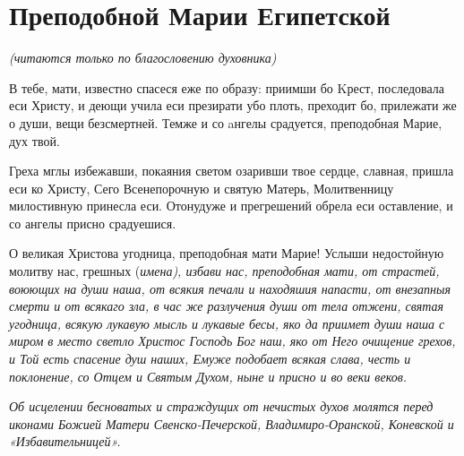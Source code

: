 

\label{_content_prinapadenii-nechistoy-sili}

 


 

\section{Преподобной Марии Египетской}
 


\itshape (читаются только по благословению духовника)\normalfont{}




В тебе, мати, известно спасеся еже по образу: приимши бо Kрест, последовала еси Христу, и деющи учила еси презирати убо плоть, преходит бо, прилежати же о души, вещи безсмертней. Темже и со aнгелы срадуется, преподобная Марие, дух твой.




Греха мглы избежавши, покаяния светом озаривши твое сердце, славная, пришла еси ко Христу, Сего Всенепорочную и святую Матерь, Молитвенницу милостивную принесла еси. Отонудуже и прегрешений обрела еси оставление, и со ангелы присно срадуешися.




О великая Христова угодница, преподобная мати Марие! Услыши недостойную молитву нас, грешных (\itshape имена\normalfont{}), избави нас, преподобная мати, от страстей, воюющих на души наша, от всякия печали и находяшия напасти, от внезапныя смерти и от всякаго зла, в час же разлучения души от тела отжени, святая угодница, всякую лукавую мысль и лукавые бесы, яко да приимет души наша с миром в место светло Христос Господь Бог наш, яко от Него очищение грехов, и Той есть спасение душ наших, Емуже подобает всякая слава, честь и поклонение, со Отцем и Святым Духом, ныне и присно и во веки веков.


\itshape Об исцелении бесноватых и страждущих от нечистых духов молятся перед иконами Божией Матери Свенско-Печерской, Владимиро-Оранской, Коневской и «Избавительницей».\normalfont{}


